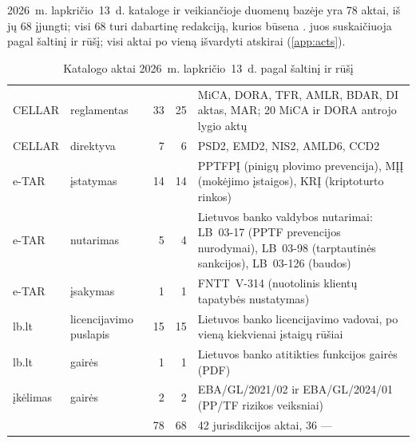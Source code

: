 2026~m. lapkričio~13~d. kataloge ir veikiančioje duomenų bazėje yra 78 aktai, iš jų 68 įjungti;
visi 68 turi dabartinę redakciją, kurios būsena .  juos
suskaičiuoja pagal šaltinį ir rūšį; visi aktai po vieną išvardyti atskirai (\cref{app:acts}).

\begin{table}[H]
\caption{Katalogo aktai 2026~m. lapkričio~13~d. pagal šaltinį ir rūšį}\label{tab:corpus:counts}
\begin{tabularx}{\textwidth}{@{}L{24mm}L{31mm}rrY@{}}
\toprule
{} &  &  &  &  \\
\midrule
CELLAR & reglamentas & 33 & 25 & MiCA, DORA, TFR, AMLR, BDAR, DI aktas, MAR; 20 MiCA ir DORA antrojo lygio aktų \\
CELLAR & direktyva & 7 & 6 & PSD2, EMD2, NIS2, AMLD6, CCD2 \\
e-TAR & įstatymas & 14 & 14 & PPTFPĮ (pinigų plovimo prevencija), MĮĮ (mokėjimo įstaigos), KRĮ (kriptoturto rinkos) \\
e-TAR & nutarimas & 5 & 4 & Lietuvos banko valdybos nutarimai: LB~03-17 (PPTF prevencijos nurodymai), LB~03-98 (tarptautinės sankcijos), LB~03-126 (baudos) \\
e-TAR & įsakymas & 1 & 1 & FNTT~V-314 (nuotolinis klientų tapatybės nustatymas) \\
lb.lt & licencijavimo puslapis & 15 & 15 & Lietuvos banko licencijavimo vadovai, po vieną kiekvienai įstaigų rūšiai \\
lb.lt & gairės & 1 & 1 & Lietuvos banko atitikties funkcijos gairės (PDF) \\
įkėlimas & gairės & 2 & 2 & EBA/GL/2021/02 ir EBA/GL/2024/01 (PP/TF rizikos veiksniai) \\
\midrule
 & & 78 & 68 & 42 jurisdikcijos  aktai, 36 ---  \\
\bottomrule
\end{tabularx}
\end{table}

